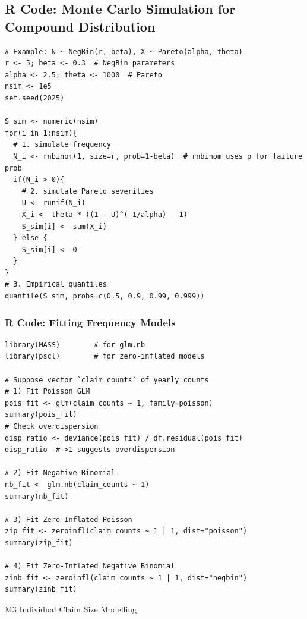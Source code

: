 \documentclass{article}
\begin{document}
\subsection{R Code: Monte Carlo Simulation for Compound Distribution}
\begin{lstlisting}
# Example: N ~ NegBin(r, beta), X ~ Pareto(alpha, theta)
r <- 5; beta <- 0.3  # NegBin parameters
alpha <- 2.5; theta <- 1000  # Pareto
nsim <- 1e5
set.seed(2025)

S_sim <- numeric(nsim)
for(i in 1:nsim){
  # 1. simulate frequency
  N_i <- rnbinom(1, size=r, prob=1-beta)  # rnbinom uses p for failure prob
  if(N_i > 0){
    # 2. simulate Pareto severities
    U <- runif(N_i)
    X_i <- theta * ((1 - U)^(-1/alpha) - 1)
    S_sim[i] <- sum(X_i)
  } else {
    S_sim[i] <- 0
  }
}
# 3. Empirical quantiles
quantile(S_sim, probs=c(0.5, 0.9, 0.99, 0.999))
\end{lstlisting}

\subsubsection{R Code: Fitting Frequency Models}
\begin{lstlisting}
library(MASS)        # for glm.nb
library(pscl)        # for zero-inflated models

# Suppose vector `claim_counts` of yearly counts
# 1) Fit Poisson GLM
pois_fit <- glm(claim_counts ~ 1, family=poisson)
summary(pois_fit)
# Check overdispersion 
disp_ratio <- deviance(pois_fit) / df.residual(pois_fit)
disp_ratio  # >1 suggests overdispersion

# 2) Fit Negative Binomial
nb_fit <- glm.nb(claim_counts ~ 1)
summary(nb_fit)

# 3) Fit Zero-Inflated Poisson
zip_fit <- zeroinfl(claim_counts ~ 1 | 1, dist="poisson")
summary(zip_fit)

# 4) Fit Zero-Inflated Negative Binomial
zinb_fit <- zeroinfl(claim_counts ~ 1 | 1, dist="negbin")
summary(zinb_fit)
\end{lstlisting}




\pagebreak


\begin{center}
    \Large{M3 Individual Claim Size Modelling}
\end{center}
\end{document}
